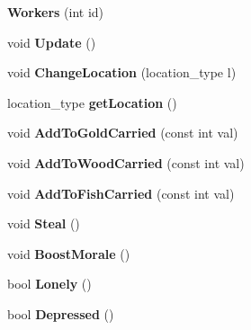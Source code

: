 \begin{DoxyCompactItemize}
\item 
\hypertarget{class_workers_aa90574d348fd6d9bce7aa4668c802f05}{}{\bfseries Workers} (int id)\label{class_workers_aa90574d348fd6d9bce7aa4668c802f05}

\item 
\hypertarget{class_workers_a70323696a9ef036f25978c0e7594bf3c}{}void {\bfseries Update} ()\label{class_workers_a70323696a9ef036f25978c0e7594bf3c}

\item 
\hypertarget{class_workers_a0ff295a940141b4b1b26cb483f4d5260}{}void {\bfseries Change\+Location} (location\+\_\+type l)\label{class_workers_a0ff295a940141b4b1b26cb483f4d5260}

\item 
\hypertarget{class_workers_a08857f839db217f4cc70270502cdc69c}{}location\+\_\+type {\bfseries get\+Location} ()\label{class_workers_a08857f839db217f4cc70270502cdc69c}

\item 
\hypertarget{class_workers_a2aaeb2392074ce8ea67bbe7469f378a5}{}void {\bfseries Add\+To\+Gold\+Carried} (const int val)\label{class_workers_a2aaeb2392074ce8ea67bbe7469f378a5}

\item 
\hypertarget{class_workers_ad4f6463e913c1d1d43cd724c3f3c0444}{}void {\bfseries Add\+To\+Wood\+Carried} (const int val)\label{class_workers_ad4f6463e913c1d1d43cd724c3f3c0444}

\item 
\hypertarget{class_workers_a9e23fa6bafb721f4903e96bf0ce86b9f}{}void {\bfseries Add\+To\+Fish\+Carried} (const int val)\label{class_workers_a9e23fa6bafb721f4903e96bf0ce86b9f}

\item 
\hypertarget{class_workers_a665001fb311f834e0c22933d3285bcc3}{}void {\bfseries Steal} ()\label{class_workers_a665001fb311f834e0c22933d3285bcc3}

\item 
\hypertarget{class_workers_a3280f043e03e520927d8bd3b468c7fc5}{}void {\bfseries Boost\+Morale} ()\label{class_workers_a3280f043e03e520927d8bd3b468c7fc5}

\item 
\hypertarget{class_workers_a83b50a9d70296590b9337c9c2f31c31c}{}bool {\bfseries Lonely} ()\label{class_workers_a83b50a9d70296590b9337c9c2f31c31c}

\item 
\hypertarget{class_workers_a580e6510e5bce327bf52752f5a5eede4}{}bool {\bfseries Depressed} ()\label{class_workers_a580e6510e5bce327bf52752f5a5eede4}


\end{DoxyCompactItemize}
